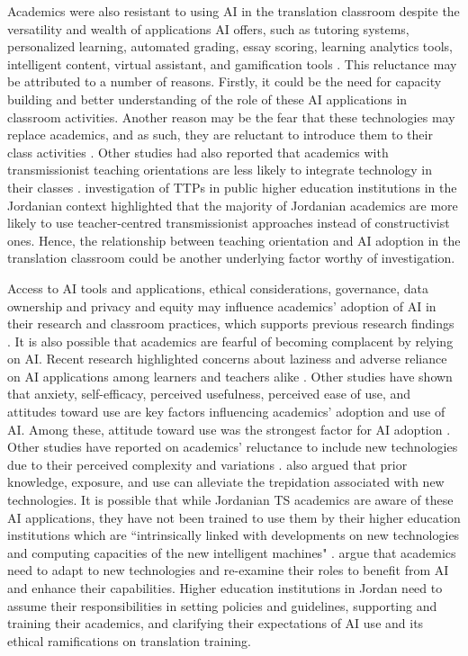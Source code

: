 \documentclass[english]{textolivre}
\begin{document}
Academics were also resistant to using AI in the translation classroom despite the versatility and wealth of applications AI offers, such as tutoring systems, personalized learning, automated grading, essay scoring, learning analytics tools, intelligent content, virtual assistant, and gamification tools \cite{owan2023}. This reluctance may be attributed to a number of reasons. Firstly, it could be the need for capacity building and better understanding of the role of these AI applications in classroom activities. Another reason may be the fear that these technologies may replace academics, and as such, they are reluctant to introduce them to their class activities \cite{owan2023}. Other studies had also reported that academics with transmissionist teaching orientations are less likely to integrate technology in their classes \cite{choi2023}. \textcite{mahadin2018} investigation of TTPs in public higher education institutions in the Jordanian context highlighted that the majority of Jordanian academics are more likely to use teacher-centred transmissionist approaches instead of constructivist ones. Hence, the relationship between teaching orientation and AI adoption in the translation classroom could be another underlying factor worthy of investigation.

Access to AI tools and applications, ethical considerations, governance, data ownership and privacy and equity may influence academics’ adoption of AI in their research and classroom practices, which supports previous research findings \cite{sahari2023, shi2025}. It is also possible that academics are fearful of becoming complacent by relying on AI. Recent research highlighted concerns about laziness and adverse reliance on AI applications among learners and teachers alike \cite{kasneci2023}. Other studies have shown that anxiety, self-efficacy, perceived usefulness, perceived ease of use, and attitudes toward use are key factors influencing academics’ adoption and use of AI. Among these, attitude toward use was the strongest factor for AI adoption \cite{wang2021}. Other studies have reported on academics’ reluctance to include new technologies due to their perceived complexity and variations \cite{celik2022}. \textcite{kaplan-rakowski2023} also argued that prior knowledge, exposure, and use can alleviate the trepidation associated with new technologies. It is possible that while Jordanian TS academics are aware of these AI applications, they have not been trained to use them by their higher education institutions which are ``intrinsically linked with developments on new technologies and computing capacities of the new intelligent machines" \cite[p. 1]{popenici2017}. \textcite{gentile2023} argue that academics need to adapt to new technologies and re-examine their roles to benefit from AI and enhance their capabilities. Higher education institutions in Jordan need to assume their responsibilities in setting policies and guidelines, supporting and training their academics, and clarifying their expectations of AI use and its ethical ramifications on translation training.
\end{document}
